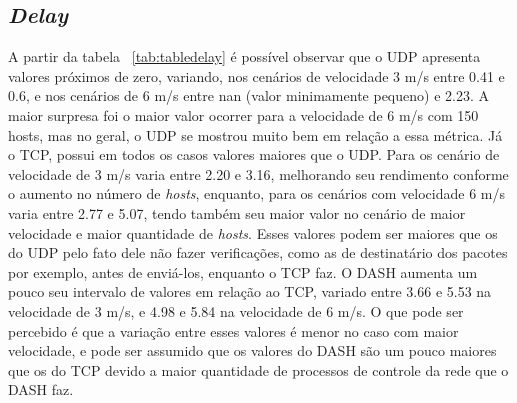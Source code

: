 \documentclass[12pt]{article}
\begin{document}
\subsection{\textit{Delay}}
	A partir da tabela ~\ref{tab:tabledelay} é possível observar que o UDP apresenta valores próximos de zero, variando, nos cenários de velocidade 3 m/s entre 0.41 e 0.6, e nos cenários de 6 m/s entre nan (valor minimamente pequeno) e 2.23. A maior surpresa foi o maior valor ocorrer para a velocidade de 6 m/s com 150 hosts, mas no geral, o UDP se mostrou muito bem em relação a essa métrica. Já o TCP, possui em todos os casos valores maiores que o UDP. Para os cenário de velocidade de 3 m/s varia entre 2.20 e 3.16, melhorando seu rendimento conforme o aumento no número de \textit{hosts}, enquanto, para os cenários com velocidade 6 m/s varia entre 2.77 e 5.07, tendo também seu maior valor no cenário de maior velocidade e maior quantidade de \textit{hosts}. Esses valores podem ser maiores que os do UDP pelo fato dele não fazer verificações, como as de destinatário dos pacotes por exemplo, antes de enviá-los, enquanto o TCP faz. O DASH aumenta um pouco seu intervalo de valores em relação ao TCP, variado entre 3.66 e 5.53  na velocidade de 3 m/s, e 4.98 e 5.84 na velocidade de 6 m/s. O que pode ser percebido é que a variação entre esses valores é menor no caso com maior velocidade, e pode ser assumido que os valores do DASH são um pouco maiores que os do TCP devido a maior quantidade de processos de controle da rede que o DASH faz.
\end{document}
